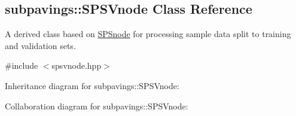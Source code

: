 \hypertarget{classsubpavings_1_1SPSVnode}{\subsection{subpavings\-:\-:\-S\-P\-S\-Vnode \-Class \-Reference}
\label{classsubpavings_1_1SPSVnode}
}


\-A derived class based on \hyperlink{classsubpavings_1_1SPSnode}{\-S\-P\-Snode} for processing sample data split to training and validation sets.  




{\ttfamily \#include $<$spsvnode.\-hpp$>$}



\-Inheritance diagram for subpavings\-:\-:\-S\-P\-S\-Vnode\-:


\-Collaboration diagram for subpavings\-:\-:\-S\-P\-S\-Vnode\-:
